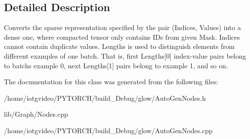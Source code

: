 \subsection{Detailed Description}
Converts the sparse representation specified by the pair (Indices, Values) into a dense one, where compacted tensor only contains I\+Ds from given Mask. Indices cannot contain duplicate values. Lengths is used to distinguish elements from different examples of one batch. That is, first Lengths\mbox{[}0\mbox{]} index-\/value pairs belong to batch\textquotesingle{}s example 0, next Lengths\mbox{[}1\mbox{]} pairs belong to example 1, and so on. 

The documentation for this class was generated from the following files\+:\begin{DoxyCompactItemize}
\item 
/home/iotgvideo/\+P\+Y\+T\+O\+R\+C\+H/build\+\_\+\+Debug/glow/Auto\+Gen\+Nodes.\+h\item 
lib/\+Graph/Nodes.\+cpp\item 
/home/iotgvideo/\+P\+Y\+T\+O\+R\+C\+H/build\+\_\+\+Debug/glow/Auto\+Gen\+Nodes.\+cpp\end{DoxyCompactItemize}
